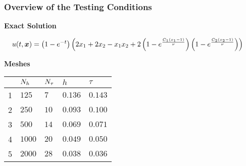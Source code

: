 \begin{frame}
    \frametitle{Overview of the Testing Conditions}

    \vspace*{\fill}
    \begin{center}
        {\color{\accentcolor} \Large \textbf{Exact Solution}}
        \vspace*{0.25cm}

        \begin{minipage}{0.75\textwidth}
            \begin{align*}
                u(t, \bm{x}) &= \left( 1 - e^{-t} \right) \left( 2 x_1 + 2 x_2 - x_1 x_2 + 2 \left( 1 - e^{\frac{C_1 \left( x_1 - 1 \right) }{\nu}} \right) \left( 1 - e^{\frac{C_2 \left( x_2 - 1 \right) }{\nu}} \right) \right)
            \end{align*}
        \end{minipage}
    \end{center}

    \vspace*{\fill}

    \begin{center}
        {\color{\accentcolor} \Large \textbf{Meshes}}
        \vspace*{0.25cm}

        \begin{minipage}{0.75\textwidth}
            \begin{table}[!ht]
                \def\arraystretch{1.25}
                \begin{tabular}{ | C{0.75cm} || C{1.75cm} | C{1.75cm} | C{1.75cm} | C{1.75cm} | }
                    \hline
                     & $N_h$ & $N_{\tau}$ & $h$ & $\tau$ \\
                    \hline
                     & $125$ & $7$ & $\num{0.136}$ & $\num{0.143}$ \\
                    2 & $250$ & $10$ & $\num{0.093}$ & $\num{0.100}$ \\
                    3 & $500$ & $14$ & $\num{0.069}$ & $\num{0.071}$ \\
                    4 & $1000$ & $20$ & $\num{0.049}$ & $\num{0.050}$ \\
                    5 & $2000$ & $28$ & $\num{0.038}$ & $\num{0.036}$ \\
                    \hline
                \end{tabular}
            \end{table}
        \end{minipage}
    \end{center}
    \vspace*{\fill}
    
\end{frame}

